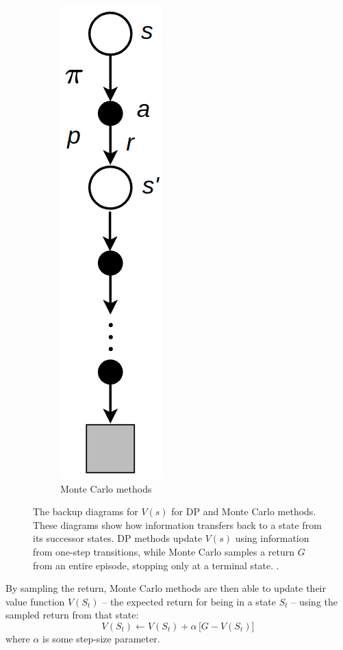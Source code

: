 \begin{figure}[hbt]
\begin{subfigure}[b]{0.29\textwidth}
        \includegraphics[scale=0.25]{figures/2_RL/2_monte_carlo_backup.png}
        \caption{Monte Carlo methods}
        \label{fig:2_monte_carlo_backup}
    \end{subfigure}
    \caption{The backup diagrams for $V(s)$ for DP and Monte Carlo methods. These diagrams show how information transfers back to a state from its successor states. DP methods update $V(s)$ using information from one-step transitions, while Monte Carlo samples a return $G$ from an entire episode, stopping only at a terminal state. \cite{suttonAndBartoBook}.}
    \label{fig:2_dp_and_monte_carlo_backup}
\end{figure}

By sampling the return, Monte Carlo methods are then able to update their value function $V(S_t)$ -- the expected return for being in a state $S_t$ -- using the sampled return from that state:
\begin{equation}
    V(S_t) \leftarrow V(S_t) + \alpha \, \Big[ G - V(S_t) \Big] \label{eq:2_MonteCarlo_prediction_simplest}
\end{equation}
where $\alpha$ is some step-size parameter.

